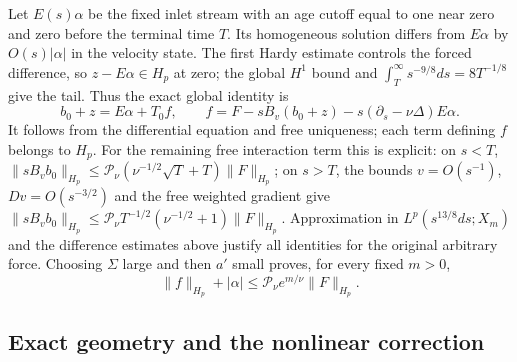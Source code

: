 Let $E(s)\alpha$ be the fixed inlet stream with an age cutoff equal
to one near zero and zero before the terminal time $T$. Its homogeneous
solution differs from $E\alpha$ by $O(s)|\alpha|$ in the velocity
state. The first Hardy estimate controls the forced difference, so
$z-E\alpha\in H_p$ at zero; the global $H^1$ bound and
$\int_T^\infty s^{-9/8}ds=8T^{-1/8}$ give the tail.
Thus the exact global identity is
\begin{equation}
 b_0+z=E\alpha+T_0 f,\qquad
 f=F-sB_v(b_0+z)-s(\partial_s-\nu\Delta)E\alpha.
 \label{short-bg:flat-reconstruction}
\end{equation}
It follows from the differential equation and free uniqueness; each
term defining $f$ belongs to $H_p$. For the remaining free interaction
term this is explicit: on $s<T$,
$\|sB_vb_0\|_{H_p}\le\mathcal P_\nu(\nu^{-1/2}\sqrt T+T)\|F\|_{H_p}$;
on $s>T$, the bounds $v=O(s^{-1})$, $Dv=O(s^{-3/2})$ and the free
weighted gradient give
$\|sB_vb_0\|_{H_p}\le\mathcal P_\nu T^{-1/2}(\nu^{-1/2}+1)\|F\|_{H_p}$.
Approximation in
$L^p(s^{13/8}ds;X_m)$ and the difference estimates above justify all
identities for the original arbitrary force. Choosing $\Sigma$ large
and then $a'$ small proves, for every fixed $m>0$,
\begin{equation}
 \|f\|_{H_p}+|\alpha|\le\mathcal P_\nu e^{m/\nu}
                                \|F\|_{H_p}.
 \label{short-bg:flat-inverse}
\end{equation}

\subsection{Exact geometry and the nonlinear correction}

